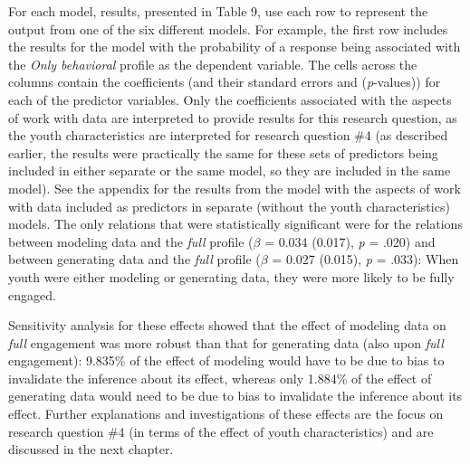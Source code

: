 \documentclass[]{msu-thesis}
\theoremstyle{definition}
\theoremstyle{definition}
\theoremstyle{definition}
\theoremstyle{remark}
\begin{document}
For each model, results, presented in Table 9, use each row to represent
the output from one of the six different models. For example, the first
row includes the results for the model with the probability of a
response being associated with the \emph{Only behavioral} profile as the
dependent variable. The cells across the columns contain the
coefficients (and their standard errors and (\emph{p}-values)) for each
of the predictor variables. Only the coefficients associated with the
aspects of work with data are interpreted to provide results for this
research question, as the youth characteristics are interpreted for
research question \#4 (as described earlier, the results were
practically the same for these sets of predictors being included in
either separate or the same model, so they are included in the same
model). See the appendix for the results from the model with the aspects
of work with data included as predictors in separate (without the youth
characteristics) models. The only relations that were statistically
significant were for the relations between modeling data and the
\emph{full} profile (\(\beta\) = 0.034 (0.017), \emph{p} = .020) and
between generating data and the \emph{full} profile (\(\beta\) = 0.027
(0.015), \emph{p} = .033): When youth were either modeling or generating
data, they were more likely to be fully engaged.

Sensitivity analysis for these effects showed that the effect of
modeling data on \emph{full} engagement was more robust than that for
generating data (also upon \emph{full} engagement): 9.835\% of the
effect of modeling would have to be due to bias to invalidate the
inference about its effect, whereas only 1.884\% of the effect of
generating data would need to be due to bias to invalidate the inference
about its effect. Further explanations and investigations of these
effects are the focus on research question \#4 (in terms of the effect
of youth characteristics) and are discussed in the next chapter.
\end{document}

